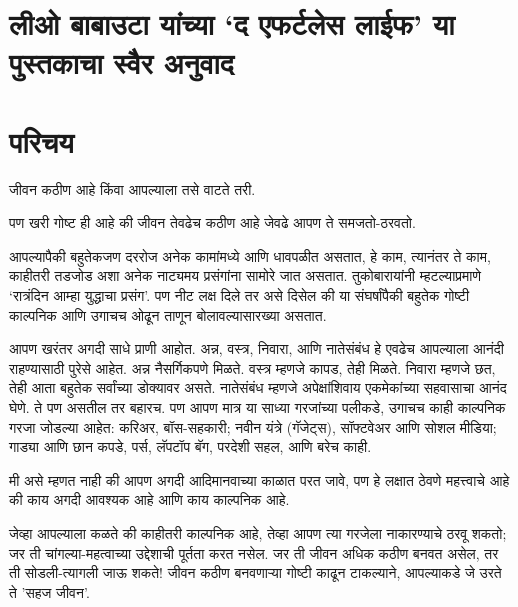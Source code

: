 \chapter*{लीओ बाबाउटा यांच्या `द एफर्टलेस लाईफ' या पुस्तकाचा स्वैर अनुवाद}

\chapter{परिचय}

जीवन कठीण आहे किंवा आपल्याला तसे वाटते तरी. 

पण खरी गोष्ट ही आहे की जीवन तेवढेच कठीण आहे जेवढे आपण ते समजतो-ठरवतो.

आपल्यापैकी बहुतेकजण दररोज अनेक कामांमध्ये आणि धावपळीत असतात, हे काम, त्यानंतर ते काम, काहीतरी  तडजोड अशा अनेक नाट्यमय प्रसंगांना सामोरे जात असतात. तुकोबारायांनी म्हटल्याप्रमाणे ‘रात्रंदिन आम्हा युद्धाचा प्रसंग’. पण नीट लक्ष दिले तर असे दिसेल की या संघर्षांपैकी बहुतेक गोष्टी काल्पनिक आणि उगाचच ओढून ताणून बोलावल्यासारख्या असतात.

आपण खरंतर अगदी साधे प्राणी आहोत. अन्न, वस्त्र, निवारा, आणि नातेसंबंध हे एवढेच आपल्याला आनंदी राहण्यासाठी पुरेसे आहेत. अन्न  नैसर्गिकपणे मिळते. वस्त्र म्हणजे कापड, तेही मिळते. निवारा म्हणजे छत, तेही आता बहुतेक सर्वांच्या डोक्यावर असते. नातेसंबंध म्हणजे अपेक्षांशिवाय एकमेकांच्या सहवासाचा आनंद घेणे. ते पण असतील तर बहारच. पण आपण मात्र या साध्या गरजांच्या पलीकडे, उगाचच काही काल्पनिक गरजा जोडल्या आहेत: करिअर, बॉस-सहकारी; नवीन यंत्रे (गॅजेट्स), सॉफ्टवेअर आणि सोशल मीडिया; गाड्या आणि छान कपडे, पर्स, लॅपटॉप बॅग, परदेशी सहल, आणि बरेच काही. 

मी असे म्हणत नाही की आपण अगदी आदिमानवाच्या काळात परत जावे, पण हे लक्षात ठेवणे महत्त्वाचे आहे की काय अगदी आवश्यक आहे आणि काय काल्पनिक आहे.

जेव्हा आपल्याला कळते की काहीतरी काल्पनिक आहे, तेव्हा आपण त्या गरजेला नाकारण्याचे ठरवू शकतो; जर ती चांगल्या-महत्वाच्या  उद्देशाची पूर्तता करत नसेल. जर ती जीवन अधिक कठीण बनवत असेल, तर ती सोडली-त्यागली जाऊ शकते! जीवन कठीण बनवणाऱ्या गोष्टी काढून टाकल्याने, आपल्याकडे जे उरते ते 'सहज जीवन'.

